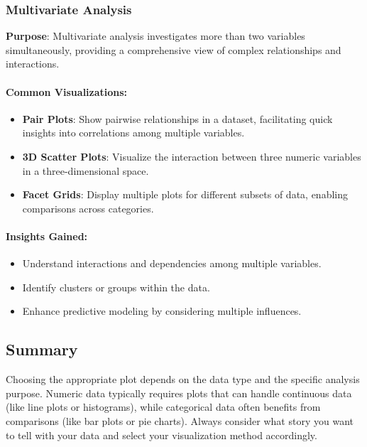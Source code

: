 \documentclass[
  letterpaper,
  DIV=11,
  numbers=noendperiod]{scrreprt}
\let\oldparagraph\paragraph
\renewcommand{\paragraph}[1]{\oldparagraph{#1}\mbox{}}
\providecommand{\tightlist}{%
  \setlength{\itemsep}{0pt}\setlength{\parskip}{0pt}}\usepackage{longtable,booktabs,array}
\begin{document}
\hypertarget{multivariate-analysis}{%
\subsubsection{Multivariate Analysis}\label{multivariate-analysis}}

\textbf{Purpose}: Multivariate analysis investigates more than two
variables simultaneously, providing a comprehensive view of complex
relationships and interactions.

\hypertarget{common-visualizations-2}{%
\paragraph{Common Visualizations:}\label{common-visualizations-2}}

\begin{itemize}
\tightlist
\item
  \textbf{Pair Plots}: Show pairwise relationships in a dataset,
  facilitating quick insights into correlations among multiple
  variables.
\item
  \textbf{3D Scatter Plots}: Visualize the interaction between three
  numeric variables in a three-dimensional space.
\item
  \textbf{Facet Grids}: Display multiple plots for different subsets of
  data, enabling comparisons across categories.
\end{itemize}

\hypertarget{insights-gained-2}{%
\paragraph{Insights Gained:}\label{insights-gained-2}}

\begin{itemize}
\tightlist
\item
  Understand interactions and dependencies among multiple variables.
\item
  Identify clusters or groups within the data.
\item
  Enhance predictive modeling by considering multiple influences.
\end{itemize}

\hypertarget{summary-1}{%
\subsection{Summary}\label{summary-1}}

Choosing the appropriate plot depends on the data type and the specific
analysis purpose. Numeric data typically requires plots that can handle
continuous data (like line plots or histograms), while categorical data
often benefits from comparisons (like bar plots or pie charts). Always
consider what story you want to tell with your data and select your
visualization method accordingly.
\end{document}
